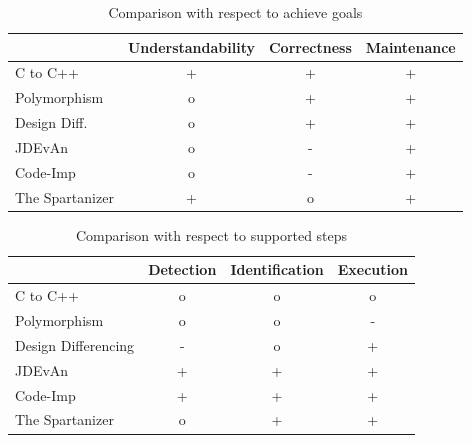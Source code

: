 \documentclass[conference,compsoc,a4paper]{IEEEtran}
\begin{document}
\begin{table}[]
  \centering
  \caption{Comparison with respect to achieve goals}
  \label{tbl:goals}
  \begin{tabular}{l|l|l|l|}
    \cline{2-4}
    & Understandability & Correctness & Maintenance \\ \hline
    \multicolumn{1}{|l|}{C to C++} & \multicolumn{1}{c|}{+} & \multicolumn{1}{c|}{+} & \multicolumn{1}{c|}{+}\\ \hline
    \multicolumn{1}{|l|}{Polymorphism}  & \multicolumn{1}{c|}{o} & \multicolumn{1}{c|}{+} & \multicolumn{1}{c|}{+}\\ \hline
    \multicolumn{1}{|l|}{Design Diff.}  & \multicolumn{1}{c|}{o} & \multicolumn{1}{c|}{+} & \multicolumn{1}{c|}{+}\\ \hline
    \multicolumn{1}{|l|}{JDEvAn}   & \multicolumn{1}{c|}{o} & \multicolumn{1}{c|}{-} & \multicolumn{1}{c|}{+}\\ \hline
    \multicolumn{1}{|l|}{Code-Imp} & \multicolumn{1}{c|}{o} & \multicolumn{1}{c|}{-} & \multicolumn{1}{c|}{+}\\ \hline
    \multicolumn{1}{|l|}{The Spartanizer}   & \multicolumn{1}{c|}{+} & \multicolumn{1}{c|}{o} & \multicolumn{1}{c|}{+}\\ \hline
  \end{tabular}
\end{table}

\begin{table}[]
  \centering
  \caption{Comparison with respect to supported steps}
  \label{tbl:steps}
  \begin{tabular}{l|l|l|l|}
    \cline{2-4}
    & Detection & Identification & Execution \\ \hline
    \multicolumn{1}{|l|}{C to C++} & \multicolumn{1}{c|}{o} & \multicolumn{1}{c|}{o} & \multicolumn{1}{c|}{o}\\ \hline
    \multicolumn{1}{|l|}{Polymorphism}   & \multicolumn{1}{c|}{o} & \multicolumn{1}{c|}{o} & \multicolumn{1}{c|}{-}\\ \hline
    \multicolumn{1}{|l|}{Design Differencing}  & \multicolumn{1}{c|}{-} & \multicolumn{1}{c|}{o} & \multicolumn{1}{c|}{+}\\ \hline
    \multicolumn{1}{|l|}{JDEvAn}   & \multicolumn{1}{c|}{+} & \multicolumn{1}{c|}{+} & \multicolumn{1}{c|}{+}\\ \hline
    \multicolumn{1}{|l|}{Code-Imp} & \multicolumn{1}{c|}{+} & \multicolumn{1}{c|}{+} & \multicolumn{1}{c|}{+}\\ \hline
    \multicolumn{1}{|l|}{The Spartanizer}   & \multicolumn{1}{c|}{o} & \multicolumn{1}{c|}{+} & \multicolumn{1}{c|}{+}\\ \hline
  \end{tabular}
\end{table}
\end{document}
